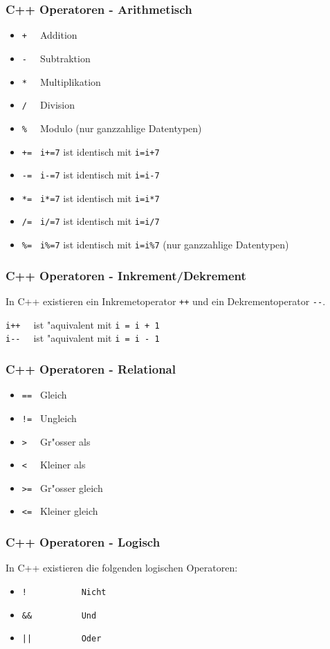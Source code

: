 \documentclass{beamer}
\begin{document}
\begin{frame}[fragile]
	\frametitle{C++ Operatoren - Arithmetisch}
	\begin{itemize}
	\item \verb|+  | Addition
	\item \verb|-  | Subtraktion
	\item \verb|*  | Multiplikation
	\item \verb|/  | Division
	\item \verb|%  | Modulo (nur ganzzahlige Datentypen)
	\item \verb|+= | \verb|i+=7| ist identisch mit \verb|i=i+7|
	\item \verb|-= | \verb|i-=7| ist identisch mit \verb|i=i-7|
	\item \verb|*= | \verb|i*=7| ist identisch mit \verb|i=i*7|
	\item \verb|/= | \verb|i/=7| ist identisch mit \verb|i=i/7|
	\item \verb|%= | \verb|i%=7| ist identisch mit \verb|i=i%7| (nur ganzzahlige Datentypen)
	\end{itemize}
\end{frame}

\begin{frame}[fragile]
	\frametitle{C++ Operatoren - Inkrement/Dekrement}
	In C++ existieren ein Inkremetoperator \verb|++| und ein
	Dekrementoperator \verb|--|.

	\vspace{5mm}

	\verb|i++  | ist "aquivalent mit \verb|i = i + 1|\\
	\verb|i--  | ist "aquivalent mit \verb|i = i - 1|
\end{frame}

\begin{frame}[fragile]
	\frametitle{C++ Operatoren - Relational}
	\begin{itemize}
	\item \verb|== | Gleich
	\item \verb|!= | Ungleich
	\item \verb|>  | Gr"osser als
	\item \verb|<  | Kleiner als
	\item \verb|>= | Gr"osser gleich
	\item \verb|<= | Kleiner gleich
	\end{itemize}
\end{frame}

\begin{frame}[fragile]
	\frametitle{C++ Operatoren - Logisch}
	In C++ existieren die folgenden logischen Operatoren:

	\begin{itemize}
	\item \verb|!           Nicht|
	\item \verb|&&          Und|
	\item \begin{verbatim}||          Oder\end{verbatim}
	\end{itemize}
\end{frame}
\end{document}
